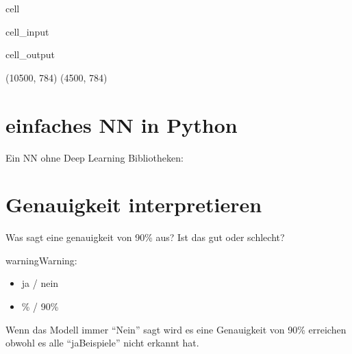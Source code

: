 \documentclass[letterpaper,10pt,english]{jupyterBook}
\begin{document}
\begin{sphinxuseclass}{cell}\begin{sphinxVerbatimInput}

\begin{sphinxuseclass}{cell_input}
\begin{sphinxVerbatim}[commandchars=\\\{\}]
\end{sphinxVerbatim}

\end{sphinxuseclass}\end{sphinxVerbatimInput}
\begin{sphinxVerbatimOutput}

\begin{sphinxuseclass}{cell_output}
\begin{sphinxVerbatim}[commandchars=\\\{\}]
(10500, 784)
(4500, 784)
\end{sphinxVerbatim}

\end{sphinxuseclass}\end{sphinxVerbatimOutput}

\end{sphinxuseclass}

\section{einfaches NN in Python}
\label{\detokenize{02_NN/NeuralNet_1:einfaches-nn-in-python}}
\sphinxAtStartPar
Ein NN ohne Deep Learning Bibliotheken:


\section{Genauigkeit interpretieren}
\label{\detokenize{02_NN/NeuralNet_1:genauigkeit-interpretieren}}
\sphinxAtStartPar
Was sagt eine genauigkeit von 90\% aus? Ist das gut oder schlecht?

\begin{sphinxadmonition}{warning}{Warning:}
\sphinxAtStartPar
{}
\begin{itemize}
\item {} 
\sphinxAtStartPar
ja / nein

\item {} 
\% / 90\%

\end{itemize}

\sphinxAtStartPar
Wenn das Modell immer “Nein” sagt wird es eine Genauigkeit von 90\% erreichen obwohl es alle “ja\sphinxhyphen{}Beispiele” nicht erkannt hat.
\end{sphinxadmonition}
\end{document}

